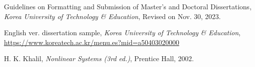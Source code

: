 \documentclass[bfive,twoside,eng]{koreatechthesis}
\theoremstyle{plain}
\begin{document}

\tableofcontents
{}
\listoftables
{}
\listoffigures
{}
\cleardoublepage		%
	
	

	
\setcounter{page}{1}








\cleardoublepage
{}		%


\begin{spacing}{1.2}
\begin{thebibliography}{99}
		Guidelines on Formatting and Submission of Master's and Doctoral Dissertations, {\it Korea University of Technology \& Education}, Revised on Nov. 30, 2023.
		
		English ver. dissertation sample, {\it Korea University of Technology \& Education}, \url{https://www.koreatech.ac.kr/menu.es?mid=a50403020000}
		
		H. K. Khalil, {\it Nonlinear Systems (3rd ed.)}, Prentice Hall, 2002.
\end{thebibliography}
\end{spacing}
\end{document}
